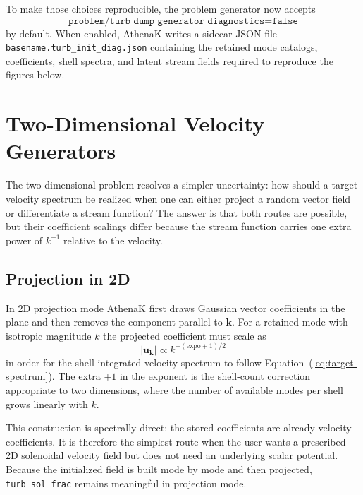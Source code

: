 \documentclass[twocolumn]{aastex7}
\newcommand{\code}[1]{\texttt{#1}}
\begin{document}
To make those choices reproducible, the problem generator now accepts
\begin{equation}
\code{problem/turb\_dump\_generator\_diagnostics} = \code{false}
\end{equation}
by default. When enabled, AthenaK writes a sidecar JSON file \code{basename.turb\_init\_diag.json} containing the retained mode catalogs, coefficients, shell spectra, and latent stream fields required to reproduce the figures below.

\section{Two-Dimensional Velocity Generators}
\label{sec:2d}
The two-dimensional problem resolves a simpler uncertainty: how should a target velocity spectrum be realized when one can either project a random vector field or differentiate a stream function? The answer is that both routes are possible, but their coefficient scalings differ because the stream function carries one extra power of $k^{-1}$ relative to the velocity.

\subsection{Projection in 2D}
In 2D projection mode AthenaK first draws Gaussian vector coefficients in the plane and then removes the component parallel to $\mathbf{k}$. For a retained mode with isotropic magnitude $k$ the projected coefficient must scale as
\begin{equation}
|\mathbf{u}_{\mathbf{k}}| \propto k^{-(\mathrm{expo}+1)/2}
\label{eq:2d-projection-law}
\end{equation}
in order for the shell-integrated velocity spectrum to follow Equation~(\ref{eq:target-spectrum}). The extra $+1$ in the exponent is the shell-count correction appropriate to two dimensions, where the number of available modes per shell grows linearly with $k$.

This construction is spectrally direct: the stored coefficients are already velocity coefficients. It is therefore the simplest route when the user wants a prescribed 2D solenoidal velocity field but does not need an underlying scalar potential. Because the initialized field is built mode by mode and then projected, \code{turb\_sol\_frac} remains meaningful in projection mode.
\end{document}
